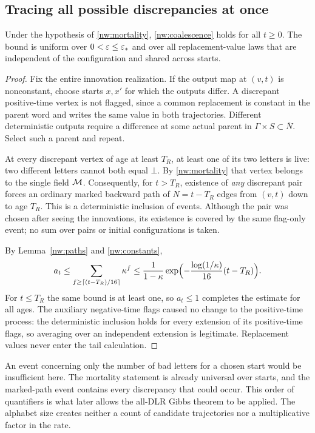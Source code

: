 \subsection{Tracing all possible discrepancies at once}

\begin{lemma}\label{nw:allinput}
Under the hypothesis of \cref{nw:mortality}, \eqref{nw:coalescence} holds for all $t\ge0$. The bound is uniform over $0<\varepsilon\le\varepsilon_*$ and over all replacement-value laws that are independent of the configuration and shared across starts.
\end{lemma}
\begin{proof}
Fix the entire innovation realization. If the output map at $(v,t)$ is nonconstant, choose starts $x,x'$ for which the outputs differ. A discrepant positive-time vertex is not flagged, since a common replacement is constant in the parent word and writes the same value in both trajectories. Different deterministic outputs require a difference at some actual parent in $\Gamma\times S\subset\overline N$. Select such a parent and repeat.

At every discrepant vertex of age at least $T_R$, at least one of its two letters is live: two different letters cannot both equal $\bot$. By \cref{nw:mortality} that vertex belongs to the single field $\mathcal M$. Consequently, for $t>T_R$, existence of \emph{any} discrepant pair forces an ordinary marked backward path of $N=t-T_R$ edges from $(v,t)$ down to age $T_R$. This is a deterministic inclusion of events. Although the pair was chosen after seeing the innovations, its existence is covered by the same flag-only event; no sum over pairs or initial configurations is taken.

By Lemma~\ref{nw:paths} and \eqref{nw:constants},
\[
  a_t\le\sum_{f\ge\lceil(t-T_R)/16\rceil}\kappa^f
  \le\frac{1}{1-\kappa}\exp\Bigl(-\frac{\log(1/\kappa)}{16}(t-T_R)\Bigr).
\]
For $t\le T_R$ the same bound is at least one, so $a_t\le1$ completes the estimate for all ages. The auxiliary negative-time flags caused no change to the positive-time process: the deterministic inclusion holds for every extension of its positive-time flags, so averaging over an independent extension is legitimate. Replacement values never enter the tail calculation.
\end{proof}

An event concerning only the number of bad letters for a chosen start would be insufficient here. The mortality statement is already universal over starts, and the marked-path event contains every discrepancy that could occur. This order of quantifiers is what later allows the all-DLR Gibbs theorem to be applied. The alphabet size creates neither a count of candidate trajectories nor a multiplicative factor in the rate.

